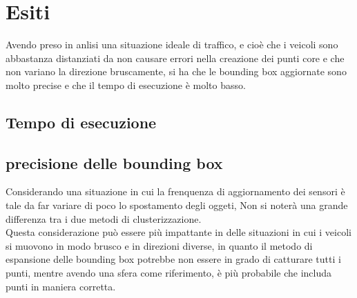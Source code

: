 \documentclass[italian]{article}
\begin{document}
\section*{Esiti}
Avendo preso in anlisi una situazione ideale di traffico, e cioè che i veicoli sono abbastanza distanziati da non causare errori nella creazione dei punti core e che non variano la direzione bruscamente, si ha che le bounding box aggiornate sono molto precise e che il tempo di esecuzione è molto basso.\\
\subsection{Tempo di esecuzione}
\subsection{precisione delle bounding box}
Considerando una situazione in cui la frenquenza di aggiornamento dei sensori è tale da far variare di poco lo spostamento degli oggeti, Non si noterà una grande differenza tra i due metodi di clusterizzazione.\\
Questa considerazione può essere più impattante in delle situazioni in cui i veicoli si muovono in modo brusco e in direzioni diverse, in quanto il metodo di espansione delle bounding box potrebbe non essere in grado di catturare tutti i punti, mentre avendo una sfera come riferimento, è più probabile che includa punti in maniera corretta.\\
\end{document}

